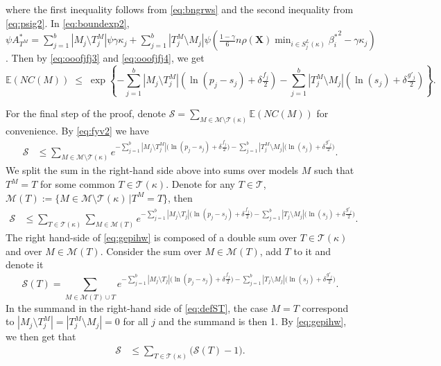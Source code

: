 \documentclass[bj,authoryear]{imsart}
\theoremstyle{plain}
\newcommand{\E}{\mathbb{E}}
\newcommand{\M}{\mathcal{M}}
\newcommand{\T}{\mathcal{T}}
\newcommand{\bs}{\boldsymbol}
\begin{document}
where the first inequality follows from \eqref{eq:bngrws} and the second inequality from \eqref{eq:psig2}. In \eqref{eq:boundexp2}, $\psi A^*_{T^M}=\sum_{j=1}^b|M_j \setminus T^M_j|\psi\gamma\kappa_j + \sum_{j=1}^b |T^M_j \setminus M_j|\psi\left(\tfrac{1-\gamma}{6} n \rho(\bs X) \min_{i\in S^{L}_j(\kappa)}{\beta^*_i}^{2} - \gamma\kappa_j\right)$. Then by \eqref{eq:ooofjfj3} and \eqref{eq:ooofjfj4}, we get
\begin{equation}\label{eq:fyv2}
\E(NC(M))\;\leq\;\exp\left\{- \sum_{j=1}^b |M_j\setminus T^M_j|(\ln(p_j-s_j)+\delta \tfrac{f_j}{2})-\sum_{j=1}^b |T^M_j\setminus M_j|(\ln(s_j)+\delta \tfrac{g'_j}{2})\right\}.
\end{equation}

For the final step of the proof, denote $\mathcal{S}= \sum_{M \in \M\setminus \T(\kappa)} \E\left(NC(M)\right)$ for convenience. By \eqref{eq:fyv2} we have
\begin{align*}
    \mathcal{S} &\leq \sum_{M \in \M\setminus \T(\kappa)}e^{- \sum_{j=1}^b |M_j\setminus T^M_j|\big(\ln(p_j-s_j)+\delta \tfrac{f_j}{2}\big)-\sum_{j=1}^b |T^M_j\setminus M_j|\big(\ln(s_j)+\delta \tfrac{g'_j}{2}\big)}.
\end{align*}
We split the sum in the right-hand side above into sums over models $M$ %
such that $T^M=T$ for some common $T\in \T(\kappa)$. Denote for any $T\in \T$,\, $\M(T):=\{M \in \M\setminus \T(\kappa) \,| T^M=T\}$, then
\begin{align}\label{eq:gepihw}
    \mathcal{S} &\leq \sum_{T \in \T(\kappa)}\sum_{M \in \M(T)}e^{- \sum_{j=1}^b |M_j\setminus T_j|\big(\ln(p_j-s_j)+\delta \tfrac{f_j}{2}\big)-\sum_{j=1}^b |T_j\setminus M_j|\big(\ln(s_j)+\delta \tfrac{g'_j}{2}\big)}.
\end{align}
The right hand-side of \eqref{eq:gepihw} is composed of a double sum over $T \in \T(\kappa)$ and over $M \in \M(T)$. Consider the sum over $M \in \M(T)$, add $T$ to it and denote it
\begin{equation}\label{eq:defST}
  \mathcal{S}(T)=\sum_{M \in \M(T) \cup T}e^{- \sum_{j=1}^b |M_j\setminus T_j|\big(\ln(p_j-s_j)+\delta \tfrac{f_j}{2}\big)-\sum_{j=1}^b |T_j\setminus M_j|\big(\ln(s_j)+\delta \tfrac{g'_j}{2}\big)}.
\end{equation}
In the summand in the right-hand side of \eqref{eq:defST}, the case $M=T$ correspond to $|M_j\setminus T^M_j|=|T^M_j\setminus M_j|=0$ for all $j$ and the summand is then 1.
By \eqref{eq:gepihw}, we then get that
\begin{align}\label{eq:gepihw2}
    \mathcal{S} &\leq \sum_{T \in \T(\kappa)}\big(\mathcal{S}(T)-1\big).
\end{align}
\end{document}
